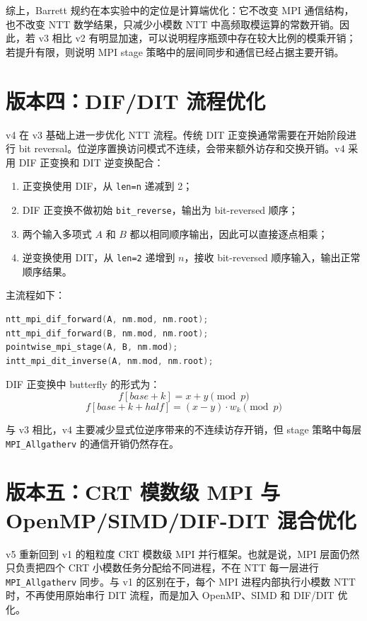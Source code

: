 \documentclass[a4paper]{article}
\begin{document}
综上，Barrett 规约在本实验中的定位是计算端优化：它不改变 MPI 通信结构，也不改变 NTT 数学结果，只减少小模数 NTT 中高频取模运算的常数开销。因此，若 v3 相比 v2 有明显加速，可以说明程序瓶颈中存在较大比例的模乘开销；若提升有限，则说明 MPI stage 策略中的层间同步和通信已经占据主要开销。

\section{版本四：DIF/DIT 流程优化}

v4 在 v3 基础上进一步优化 NTT 流程。传统 DIT 正变换通常需要在开始阶段进行 bit reversal。位逆序置换访问模式不连续，会带来额外访存和交换开销。v4 采用 DIF 正变换和 DIT 逆变换配合：
\begin{enumerate}
    \item 正变换使用 DIF，从 \texttt{len=n} 递减到 2；
    \item DIF 正变换不做初始 \texttt{bit\_reverse}，输出为 bit-reversed 顺序；
    \item 两个输入多项式 $A$ 和 $B$ 都以相同顺序输出，因此可以直接逐点相乘；
    \item 逆变换使用 DIT，从 \texttt{len=2} 递增到 $n$，接收 bit-reversed 顺序输入，输出正常顺序结果。
\end{enumerate}

主流程如下：
\begin{lstlisting}[language=C++,title=DIF/DIT NTT 主流程]
ntt_mpi_dif_forward(A, nm.mod, nm.root);
ntt_mpi_dif_forward(B, nm.mod, nm.root);
pointwise_mpi_stage(A, B, nm.mod);
intt_mpi_dit_inverse(A, nm.mod, nm.root);
\end{lstlisting}

DIF 正变换中 butterfly 的形式为：
\[
f[base+k]=x+y\pmod p
\]
\[
f[base+k+half]=(x-y)\cdot w_k\pmod p
\]

与 v3 相比，v4 主要减少显式位逆序带来的不连续访存开销，但 stage 策略中每层 \texttt{MPI\_Allgatherv} 的通信开销仍然存在。

\section{版本五：CRT 模数级 MPI 与 OpenMP/SIMD/DIF-DIT 混合优化}

v5 重新回到 v1 的粗粒度 CRT 模数级 MPI 并行框架。也就是说，MPI 层面仍然只负责把四个 CRT 小模数任务分配给不同进程，不在 NTT 每一层进行 \texttt{MPI\_Allgatherv} 同步。与 v1 的区别在于，每个 MPI 进程内部执行小模数 NTT 时，不再使用原始串行 DIT 流程，而是加入 OpenMP、SIMD 和 DIF/DIT 优化。
\end{document}
